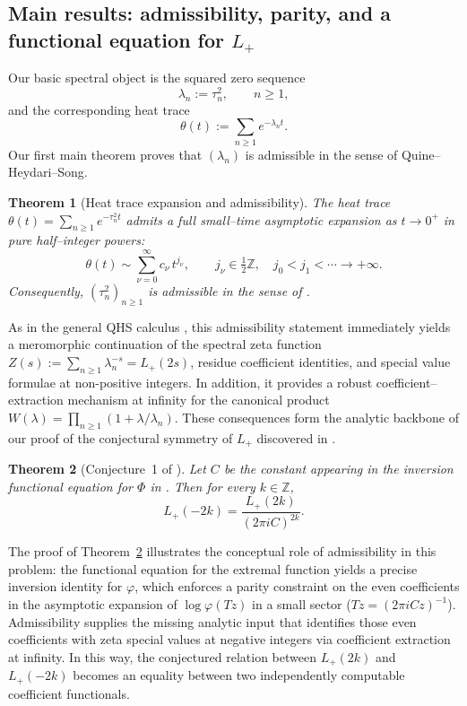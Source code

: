 \documentclass[11pt,letterpaper]{amsart}
\numberwithin{equation}{section}
\newtheorem{theorem}{Theorem}[section]
\theoremstyle{definition}
\newcommand{\Z}{\mathbb{Z}}
\begin{document}
\subsection{Main results: admissibility, parity, and a functional equation for $L_+$}

Our basic spectral object is the squared zero sequence
\[
\lambda_n:=\tau_n^2,\qquad n\ge1,
\]
and the corresponding heat trace
\[
\theta(t):=\sum_{n\ge1}e^{-\lambda_n t}.
\]
Our first main theorem proves that $(\lambda_n)$ is admissible in the sense of
Quine--Heydari--Song.

\begin{theorem}[Heat trace expansion and admissibility]\label{thm:intro-adm}
The heat trace $\theta(t)=\sum_{n\ge1}e^{-\tau_n^2 t}$ admits a full small--time asymptotic
expansion as $t\to0^+$ in \emph{pure} half--integer powers:
\[
\theta(t)\sim \sum_{\nu=0}^\infty c_\nu\,t^{j_\nu},
\qquad j_\nu\in\tfrac12\Z,\quad j_0<j_1<\cdots\to+\infty.
\]
Consequently, $(\tau_n^2)_{n\ge1}$ is admissible in the sense of \cite{QHS}.
\end{theorem}

As in the general QHS calculus \cite{QHS}, this admissibility statement immediately yields
a meromorphic continuation of the spectral zeta function
$Z(s):=\sum_{n\ge1}\lambda_n^{-s}=L_+(2s)$, residue coefficient identities,
and special value formulae at non-positive integers. In addition, it provides a robust
coefficient--extraction mechanism at infinity for the canonical product
$W(\lambda)=\prod_{n\ge1}(1+\lambda/\lambda_n)$.
These consequences form the analytic backbone of our proof of the conjectural symmetry
of $L_+$ discovered in \cite{BOCRS}.

\begin{theorem}[Conjecture~1 of \cite{BOCRS}]\label{thm:intro-conj}
Let $C$ be the constant appearing in the inversion functional equation for $\Phi$ in \cite{BOCRS}.
Then for every $k\in\Z$,
\[
L_+(-2k)=\frac{L_+(2k)}{(2\pi i C)^{2k}}.
\]
\end{theorem}

The proof of Theorem~\ref{thm:intro-conj} illustrates the conceptual role of admissibility
in this problem: the functional equation for the extremal function yields a precise
inversion identity for $\varphi$, which enforces a parity constraint on the even
coefficients in the asymptotic expansion of $\log\varphi(Tz)$ in a small sector
($Tz=(2\pi i C z)^{-1}$). Admissibility supplies the missing analytic input that
identifies those even coefficients with zeta special values at negative integers via
coefficient extraction at infinity.  In this way, the conjectured relation between
$L_+(2k)$ and $L_+(-2k)$ becomes an equality between two independently computable
coefficient functionals.
\end{document}
